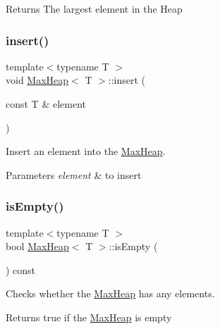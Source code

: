 \begin{DoxyReturn}{Returns}
The largest element in the Heap 
\end{DoxyReturn}
\mbox{\label{class_max_heap_ab44116cd54d2caa1307df0d073e67514}} 
\subsubsection{\texorpdfstring{insert()}{insert()}}
{\footnotesize\ttfamily template$<$typename T $>$ \\
void \hyperlink{class_max_heap}{Max\+Heap}$<$ T $>$\+::insert (\begin{DoxyParamCaption}\item[{const T \&}]{element }\end{DoxyParamCaption})}



Insert an element into the \hyperlink{class_max_heap}{Max\+Heap}. 


\begin{DoxyParams}{Parameters}
{\em element} & to insert \\
\hline
\end{DoxyParams}
\mbox{\label{class_max_heap_aff04964e9ead102a8b98eaa00836351c}} 
\subsubsection{\texorpdfstring{is\+Empty()}{isEmpty()}}
{\footnotesize\ttfamily template$<$typename T $>$ \\
bool \hyperlink{class_max_heap}{Max\+Heap}$<$ T $>$\+::is\+Empty (\begin{DoxyParamCaption}{ }\end{DoxyParamCaption}) const}



Checks whether the \hyperlink{class_max_heap}{Max\+Heap} has any elements. 

\begin{DoxyReturn}{Returns}
true if the \hyperlink{class_max_heap}{Max\+Heap} is empty 
\end{DoxyReturn}
\mbox{\label{class_max_heap_acb7f5834d10b183fd9e38992f563ba86}} 
